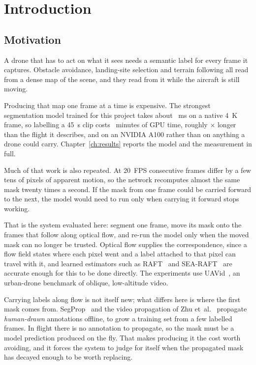 \documentclass[report.tex]{subfiles}
\begin{document}
\chapter{Introduction}
\label{ch:intro}

\section{Motivation}
\label{sec:motivation}

A drone that has to act on what it sees needs a semantic label for every frame
it captures. Obstacle avoidance, landing-site selection and terrain following
all read from a dense map of the scene, and they read from it while the
aircraft is still moving.

Producing that map one frame at a time is expensive. The strongest
segmentation model trained for this project takes about \LatTypical~ms on a
native \SI{4}{K} frame, so labelling a \SI{45}{s} clip costs
\ClipMinutes~minutes of GPU time, roughly \RealtimeFactor$\times$ longer than
the flight it describes, and on an NVIDIA A100 rather than on anything a
drone could carry. Chapter~\ref{ch:results} reports the model and the
measurement in full.

Much of that work is also repeated. At \SI{20}{FPS} consecutive frames differ
by a few tens of pixels of apparent motion, so the network recomputes almost
the same mask twenty times a second. If the mask from one frame could be
carried forward to the next, the model would need to run only when carrying it
forward stops working.

That is the system evaluated here: segment one frame, move its mask onto the
frames that follow along optical flow, and re-run the model only when the moved
mask can no longer be trusted. Optical flow supplies the correspondence, since
a flow field states where each pixel went and a label attached to that pixel
can travel with it, and learned estimators such as RAFT~\cite{raft2020} and
SEA-RAFT~\cite{searaft2024} are accurate enough for this to be done directly.
The experiments use UAVid~\cite{uavid2020}, an urban-drone benchmark of
oblique, low-altitude video.

Carrying labels along flow is not itself new; what differs here is where the
first mask comes from. SegProp~\cite{segprop2020} and the video propagation of
Zhu et~al.~\cite{zhu2019} propagate \emph{human-drawn} annotations offline, to
grow a training set from a few labelled frames. In flight there is no
annotation to propagate, so the mask must be a model prediction produced on
the fly. That makes producing it the cost worth avoiding, and it forces the
system to judge for itself when the propagated mask has decayed enough to be
worth replacing.
\end{document}
